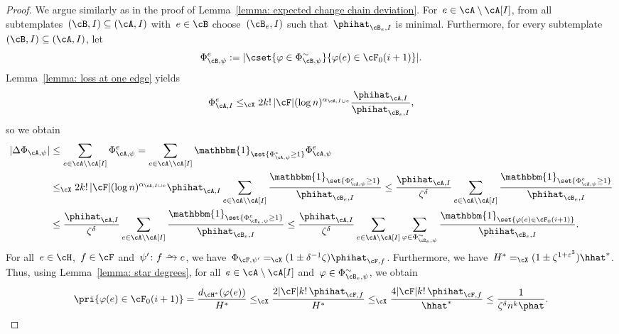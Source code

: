 \documentclass[11pt]{amsart}
\newcommand{\eps}{\varepsilon}
\DeclarePairedDelimiter{\abs}{\lvert}{\rvert}
\newcommand{\ind}{\mathbbm{1}}
\newcommand{\Xleq}{\leq_{\cX}}
\newcommand{\Xeq}{=_{\cX}}
\def\phi{\varphi}
\newcommand{\bijection}{\mathchoice
	{\xrightarrow{\smash{\raisebox{-3pt}{$\scriptstyle\sim$}}}}%
	{\xrightarrow{\smash{\raisebox{-3pt}{$\scriptstyle\sim$}}}}%
	{\xrightarrow{\smash{\raisebox{-2.5pt}{$\scriptscriptstyle\sim$}}}}%
	{\xrightarrow{\smash{\raisebox{-2.5pt}{$\scriptscriptstyle\sim$}}}}%
}
\theoremstyle{definition}
\numberwithin{equation}{section}
\begin{document}
\begin{proof}
		We argue similarly as in the proof of Lemma~\ref{lemma: expected change chain deviation}.
		For~$e\in\cA\setminus\cA[I]$, from all subtemplates~$(\cB,I)\subseteq(\cA,I)$ with~$e\in\cB$ choose~$(\cB_e,I)$ such that~$\phihat_{\cB_e,I}$ is minimal.
		Furthermore, for every subtemplate~$(\cB,I)\subseteq (\cA,I)$, let
		\begin{equation*}
			\Phi^e_{\cB,\psi}:=\abs{\cset{ \phi\in \Phi^\sim_{\cB,\psi} }{ \phi(e)\in \cF_0(i+1) }}.
		\end{equation*}
		Lemma~\ref{lemma: loss at one edge} yields
		\begin{equation*}
			\Phi^e_{\cA,I}
			\Xleq 2k!\,\abs{\cF}(\log n)^{\alpha_{\cA,I\cup e}} \frac{\phihat_{\cA,I}}{\phihat_{\cB_e,I}},
		\end{equation*}
		so we obtain
		\begin{equation}\label{equation: random upper bound balanced change}
			\begin{aligned}
				\abs{\Delta \Phi_{\cA,\psi}}
				&\leq \sum_{e\in\cA\setminus\cA[I]}\Phi^e_{\cA,\psi}
				= \sum_{e\in\cA\setminus\cA[I]}\ind_{\set{\Phi^e_{\cA,\psi}\geq 1}}\Phi^e_{\cA,\psi}\\
				&\Xleq 2k!\,\abs{\cF}(\log n)^{\alpha_{\cA,I\cup e}}\phihat_{\cA,I}\sum_{e\in\cA\setminus\cA[I]} \frac{\ind_{\set{\Phi^e_{\cA,\psi}\geq 1}}}{\phihat_{\cB_e,I}}
				\leq \frac{\phihat_{\cA,I}}{\zeta^\delta}\sum_{e\in\cA\setminus\cA[I]} \frac{\ind_{\set{\Phi^e_{\cA,\psi}\geq 1}}}{\phihat_{\cB_e,I}}\\
				&\leq \frac{\phihat_{\cA,I}}{\zeta^\delta}\sum_{e\in\cA\setminus\cA[I]} \frac{\ind_{\set{\Phi^e_{\cB_e,\psi}\geq 1}}}{\phihat_{\cB_e,I}}
				\leq \frac{\phihat_{\cA,I}}{\zeta^\delta}\sum_{e\in\cA\setminus\cA[I]}\sum_{\phi\in\Phi_{\cB_e,\psi}^\sim} \frac{\ind_{\set{\phi(e)\in\cF_0(i+1)}}}{\phihat_{\cB_e,I}}.
			\end{aligned}
		\end{equation}
		For all~$e\in \cH$,~$f\in\cF$ and~$\psi'\colon f\bijection e$, we have~$\Phi_{\cF,\psi'}\Xeq (1\pm \delta^{-1}\zeta)\phihat_{\cF,f}$.
		Furthermore, we have~$H^*\Xeq (1\pm \zeta^{1+\eps^3})\hhat^*$.
		Thus, using Lemma~\ref{lemma: star degrees}, for all~$e\in\cA\setminus\cA[I]$ and~$\phi\in\Phi_{\cB_e,\psi}^\sim$, we obtain
		\begin{equation*}
			\pri{\phi(e)\in\cF_0(i+1)}
			= \frac{ d_{\cH^*}(\phi(e)) }{H^*}
			\Xleq \frac{ 2\abs{\cF}k!\,\phihat_{\cF,f}  }{H^*}
			\Xleq \frac{ 4\abs{\cF}k!\,\phihat_{\cF,f}  }{\hhat^*}
			\leq \frac{1}{\zeta^\delta n^k\phat}.
		\end{equation*}

\end{proof}
\end{document}

